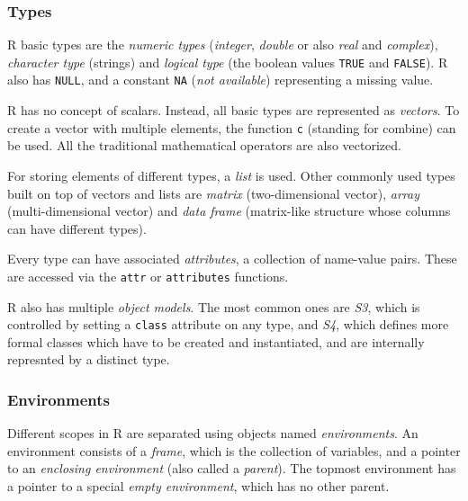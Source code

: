 \subsubsection*{Types}

R basic types are the \textit{numeric types} (\textit{integer}, \textit{double} or also \textit{real} and \textit{complex}), \textit{character type} (strings) and \textit{logical type} (the boolean values \texttt{TRUE} and \texttt{FALSE}). R also has \texttt{NULL}, and a constant \texttt{NA} (\textit{not available}) representing a missing value.

R has no concept of scalars. Instead, all basic types are represented as \textit{vectors}. To create a vector with multiple elements, the function \texttt{c} (standing for combine) can be used. All the traditional mathematical operators are also vectorized.

For storing elements of different types, a \textit{list} is used. Other commonly used types built on top of vectors and lists are \textit{matrix} (two-dimensional vector), \textit{array} (multi-dimensional vector) and \textit{data frame} (matrix-like structure whose columns can have different types).

Every type can have associated \textit{attributes}, a collection of name-value pairs. These are accessed via the \texttt{attr} or \texttt{attributes} functions.

R also has multiple \textit{object models}. The most common ones are \textit{S3}, which is controlled by setting a \texttt{class} attribute on any type, and \textit{S4}, which defines more formal classes which have to be created and instantiated, and are internally represnted by a distinct type.

\subsubsection*{Environments}

Different scopes in R are separated using objects named \textit{environments}. An environment consists of a \textit{frame}, which is the collection of variables, and a pointer to an \textit{enclosing environment} (also called a \textit{parent}). The topmost environment has a pointer to a special \textit{empty environment}, which has no other parent.

